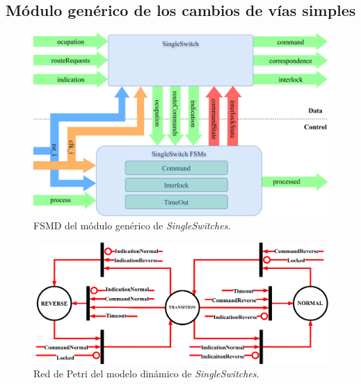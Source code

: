\subsection{Módulo genérico de los cambios de vías simples}

\lipsum[1]

\begin{figure}[H]
	\centering
	\includegraphics[width=1\textwidth]{Figuras/SSW_module}
	\centering\caption{FSMD del módulo genérico de \textit{SingleSwitches}.}
	\label{fig:SSW_module}
\end{figure}

\lipsum[1]

\begin{figure}[H]
	\centering
	\includegraphics[width=1\textwidth]{Figuras/SSW_Petri}
	\centering\caption{Red de Petri del modelo dinámico de \textit{SingleSwitches}.}
	\label{fig:SSW_Petri}
\end{figure}

\lipsum[1]
